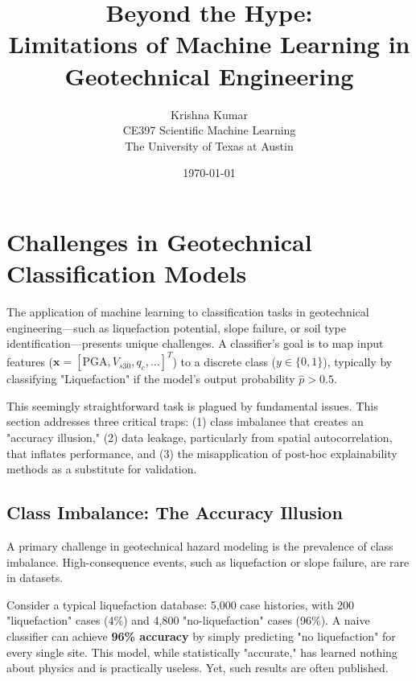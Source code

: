 \documentclass[12pt]{article}
\begin{document}
\title{\textbf{Beyond the Hype:} \\ Limitations of Machine Learning in Geotechnical Engineering}
\author{Krishna Kumar \\
\small CE397 Scientific Machine Learning \\
\small The University of Texas at Austin}
\date{\today}
\maketitle

\tableofcontents
\clearpage

\section{Challenges in Geotechnical Classification Models}

The application of machine learning to classification tasks in geotechnical engineering—such as liquefaction potential, slope failure, or soil type identification—presents unique challenges. A classifier's goal is to map input features ($\mathbf{x} = [\text{PGA}, V_{s30}, q_c, \ldots]^T$) to a discrete class ($y \in \{0,1\}$), typically by classifying "Liquefaction" if the model's output probability $\hat{p} > 0.5$.

This seemingly straightforward task is plagued by fundamental issues. This section addresses three critical traps: (1) class imbalance that creates an "accuracy illusion," (2) data leakage, particularly from spatial autocorrelation, that inflates performance, and (3) the misapplication of post-hoc explainability methods as a substitute for validation.

\subsection{Class Imbalance: The Accuracy Illusion}

A primary challenge in geotechnical hazard modeling is the prevalence of class imbalance. High-consequence events, such as liquefaction or slope failure, are rare in datasets.

Consider a typical liquefaction database: 5,000 case histories, with 200 "liquefaction" cases (4\%) and 4,800 "no-liquefaction" cases (96\%). A naive classifier can achieve \textbf{96\% accuracy} by simply predicting "no liquefaction" for every single site. This model, while statistically "accurate," has learned nothing about physics and is practically useless. Yet, such results are often published.
\end{document}
